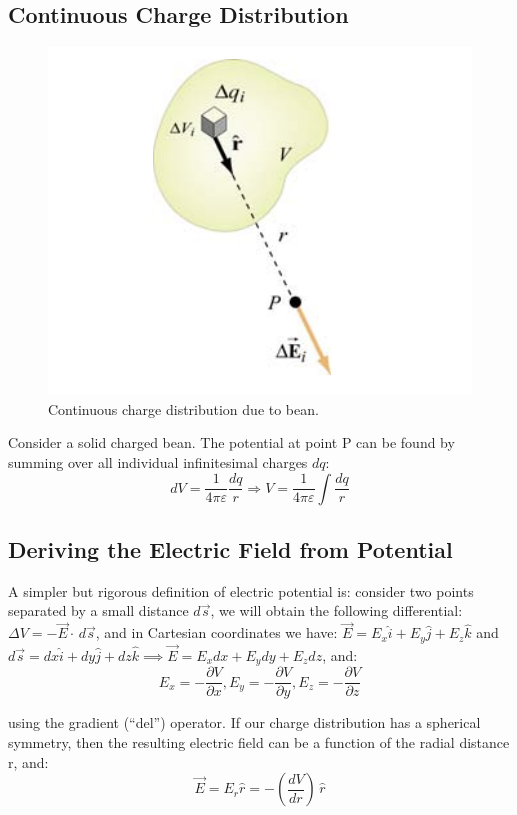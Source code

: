 \documentclass[11pt, letterpaper]{article}
\begin{document}
	\subsection{Continuous Charge Distribution}
	\begin{figure}[h!]
		\centering
		\includegraphics[scale=0.6]{volume}
		\caption{Continuous charge distribution due to bean.}
	\end{figure}
	Consider a solid charged bean. The potential at point P can be found by summing over all 
	individual infinitesimal charges $dq$:
	\begin{equation}
		dV = \frac{1}{4\pi\varepsilon}\frac{dq}{r} \Rightarrow \boxed{V = \frac{1}{4\pi\varepsilon}\int
		\frac{dq}{r}}
	\end{equation}
	
	\subsection{Deriving the Electric Field from Potential}
	A simpler but rigorous definition of electric potential is: consider two points separated by a 
	small distance $d\vec{s}$, we will obtain the following differential: $\Delta V = -\vec{E}\cdot\,
	d\vec{s}$, and in Cartesian coordinates we have: $\vec{E} = E_x\hat{i} + E_y\hat{j} + E_z\hat{k}$
	and $d\vec{s} = dx\hat{i} + dy\hat{j} + dz\hat{k} \implies \vec{E} = E_xdx + E_ydy + E_zdz$, and:
	\begin{equation}
		\boxed{E_x = -\frac{\partial V}{\partial x}, E_y = -\frac{\partial V}{\partial y}, E_z = -\frac{\partial
		V}{\partial z}}
	\end{equation}
	
	using the gradient (``del'') operator.
	If our charge distribution has a spherical symmetry, then the resulting electric field can be a 
	function of the radial distance r, and:
	\begin{equation}
		\boxed{\vec{E} = E_r\hat{r} = -\left(\frac{dV}{dr}\right)\,\hat{r} }
	\end{equation}
	
\end{document}
